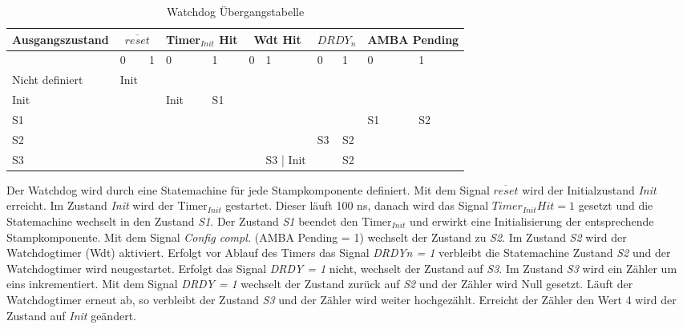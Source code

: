 \begin{table}[htb]
  	\begin{tabular}{| p{.21\linewidth} | 
				 p{.04\linewidth} | 
				 p{.04\linewidth} | 
				 p{.04\linewidth} | 
				 p{.04\linewidth} | 
				 p{.04\linewidth} | 
				 p{.04\linewidth} | 
				 p{.04\linewidth} | 
				 p{.04\linewidth} | 
				 p{.04\linewidth} | 
				 p{.04\linewidth}|}\hline 
		\textbf{Ausgangszustand} & 
		\multicolumn{2}{c|}{\textbf{$\overline{reset}$}} &  
		\multicolumn{2}{c|}{\textbf{Timer$_{Init}$ Hit}} &  
		\multicolumn{2}{c|}{\textbf{Wdt Hit}} &
		\multicolumn{2}{c|}{\textbf{ $DRDY_n$}} & 
		\multicolumn{2}{c|}{\textbf{AMBA Pending}}\\ \hline 
		& 0 & 1 & 0 & 1 & 0 & 1 & 0 & 1 & 0 & 1\\ \hline
		Nicht definiert & Init & & & & & & & & &  \\ \hline
		Init &  & & Init & S1 & & & & & & \\ \hline
		S1 &  & & &  & & & &  & S1 & S2 \\ \hline
		S2 &  & & &  & & & S3 & S2 &  &  \\ \hline
		S3 &  & & &  & & S3 | Init &  & S2 &  &  \\ \hline
	\end{tabular}
   \caption{Watchdog Übergangstabelle}
\end{table}
\renewcommand{\arraystretch}{1.0} 
\noindent
Der Watchdog wird durch eine Statemachine für jede Stampkomponente definiert. Mit dem Signal $\overline{reset}$ wird der Initialzustand \textit{Init} erreicht. Im Zustand \textit{Init} wird der Timer$_{Init}$ gestartet. Dieser läuft 100 ns, danach wird das Signal $Timer_{Init}Hit = 1$ gesetzt und die Statemachine wechselt in den Zustand \textit{S1}. Der Zustand \textit{S1} beendet den Timer$_{Init}$ und erwirkt eine Initialisierung der entsprechende Stampkomponente. Mit dem Signal \textit{Config compl.}  (AMBA Pending = 1) wechselt der Zustand zu \textit{S2}. Im Zustand \textit{S2} wird der Watchdogtimer (Wdt) aktiviert. Erfolgt vor Ablauf des Timers das Signal \textit{DRDYn = 1} verbleibt die Statemachine Zustand \textit{S2} und der Watchdogtimer wird neugestartet. Erfolgt das Signal \textit{DRDY = 1} nicht, wechselt der Zustand auf \textit{S3}. 
Im Zustand \textit{S3} wird ein Zähler um eins inkrementiert. Mit dem Signal  \textit{DRDY = 1} wechselt der Zustand zurück auf \textit{S2} und der Zähler wird Null gesetzt. Läuft der Watchdogtimer erneut ab, so verbleibt der Zustand \textit{S3} und der Zähler wird weiter hochgezählt. Erreicht der Zähler den Wert 4 wird der Zustand auf \textit{Init} geändert. 

